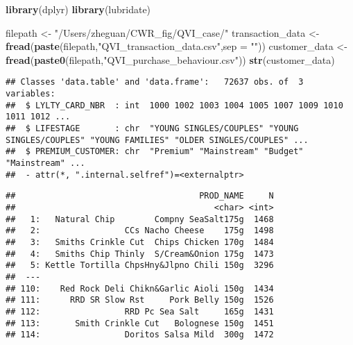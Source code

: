 \documentclass[
]{article}
\newenvironment{Shaded}{\begin{snugshade}}{\end{snugshade}}
\newcommand{\AttributeTok}[1]{\textcolor[rgb]{0.13,0.29,0.53}{#1}}
\newcommand{\FunctionTok}[1]{\textcolor[rgb]{0.13,0.29,0.53}{\textbf{#1}}}
\newcommand{\NormalTok}[1]{#1}
\newcommand{\OtherTok}[1]{\textcolor[rgb]{0.56,0.35,0.01}{#1}}
\newcommand{\SpecialCharTok}[1]{\textcolor[rgb]{0.81,0.36,0.00}{\textbf{#1}}}
\newcommand{\StringTok}[1]{\textcolor[rgb]{0.31,0.60,0.02}{#1}}
\begin{document}
\begin{Shaded}
\begin{Highlighting}[]
\FunctionTok{library}\NormalTok{(dplyr)}
\FunctionTok{library}\NormalTok{(lubridate)}
\end{Highlighting}
\end{Shaded}

\begin{Shaded}
\begin{Highlighting}[]
\NormalTok{filepath }\OtherTok{\textless{}{-}} \StringTok{"/Users/zheguan/CWR\_fig/QVI\_case/"}
\NormalTok{transaction\_data }\OtherTok{\textless{}{-}} \FunctionTok{fread}\NormalTok{(}\FunctionTok{paste}\NormalTok{(filepath,}\StringTok{"QVI\_transaction\_data.csv"}\NormalTok{,}\AttributeTok{sep =} \StringTok{""}\NormalTok{))}
\NormalTok{customer\_data }\OtherTok{\textless{}{-}} \FunctionTok{fread}\NormalTok{(}\FunctionTok{paste0}\NormalTok{(filepath,}\StringTok{"QVI\_purchase\_behaviour.csv"}\NormalTok{))}
\FunctionTok{str}\NormalTok{(customer\_data)}
\end{Highlighting}
\end{Shaded}

\begin{verbatim}
## Classes 'data.table' and 'data.frame':   72637 obs. of  3 variables:
##  $ LYLTY_CARD_NBR  : int  1000 1002 1003 1004 1005 1007 1009 1010 1011 1012 ...
##  $ LIFESTAGE       : chr  "YOUNG SINGLES/COUPLES" "YOUNG SINGLES/COUPLES" "YOUNG FAMILIES" "OLDER SINGLES/COUPLES" ...
##  $ PREMIUM_CUSTOMER: chr  "Premium" "Mainstream" "Budget" "Mainstream" ...
##  - attr(*, ".internal.selfref")=<externalptr>
\end{verbatim}

\begin{Shaded}
\end{Shaded}

\begin{verbatim}
##                                     PROD_NAME     N
##                                        <char> <int>
##   1:   Natural Chip        Compny SeaSalt175g  1468
##   2:                 CCs Nacho Cheese    175g  1498
##   3:   Smiths Crinkle Cut  Chips Chicken 170g  1484
##   4:   Smiths Chip Thinly  S/Cream&Onion 175g  1473
##   5: Kettle Tortilla ChpsHny&Jlpno Chili 150g  3296
##  ---                                               
## 110:    Red Rock Deli Chikn&Garlic Aioli 150g  1434
## 111:      RRD SR Slow Rst     Pork Belly 150g  1526
## 112:                 RRD Pc Sea Salt     165g  1431
## 113:       Smith Crinkle Cut   Bolognese 150g  1451
## 114:                 Doritos Salsa Mild  300g  1472
\end{verbatim}
\end{document}
